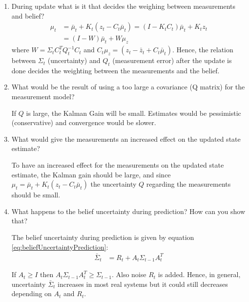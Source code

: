 \documentclass[11pt,a4paper]{article}
\begin{document}
\begin{enumerate}
	\item \addtocounter{cnt_questions}{1} During update what is it that decides the weighing between measurements and belief?
		\begin{align}
			\mu_{t} &= \bar{\mu}_{t} + K_{t} (z_{t} - C_{t} \bar{\mu}_{t}) = (I - K_{t} C_{t}) \bar{\mu}_{t} + K_{t} z_{t} \\
			&= (I - W) \bar{\mu}_{t} + W \mu_{z}
		\end{align}
		where $W = \Sigma_{t} C_{t}^{T} Q_{t}^{-1} C_{t}$ and $C_{t} \mu_{z} = (z_{t} - \bar{z}_{t} + C_{t} \bar{\mu}_{t})$. Hence, the relation between $\Sigma_{t}$ (uncertainty) and $Q_{t}$ (measurement error) after the update is done decides the weighting between the measurements and the belief.

	\item \addtocounter{cnt_questions}{1} What would be the result of using a too large a covariance (Q matrix) for the measurement model?
		\par If $Q$ is large, the Kalman Gain will be small. Estimates would be pessimistic (conservative) and convergence would be slower.

	\item \addtocounter{cnt_questions}{1} What would give the measurements an increased effect on the updated state estimate?
		\par To have an increased effect for the measurements on the updated state estimate, the Kalman gain should be large, and since $\mu_{t} = \bar{\mu}_{t} + K_{t} (z_{t} - C_{t} \bar{\mu}_{t})$ the uncertainty $Q$ regarding the measurements should be small.

	\item \addtocounter{cnt_questions}{1} What happens to the belief uncertainty during prediction? How can you show that?
		\par The belief uncertainty during prediction is given by equation \ref{eq:beliefUncertaintyPrediction}:
		\begin{align}
			\bar{\Sigma}_t &= R_{t} + A_{t} \Sigma_{t-1} A_{t}^{T} \label{eq:beliefUncertaintyPrediction}
		\end{align}
		\par If $A_{t} \geq I$ then $A_{t} \Sigma_{t-1} A_t^T \geq \Sigma_{t-1}$. Also noise $R_{t}$ is added. Hence, in general, uncertainty $\bar{\Sigma}_t$ increases in most real systems but it could still decreases depending on $A_{t}$ and $R_{t}$.


\end{enumerate}
\end{document}
